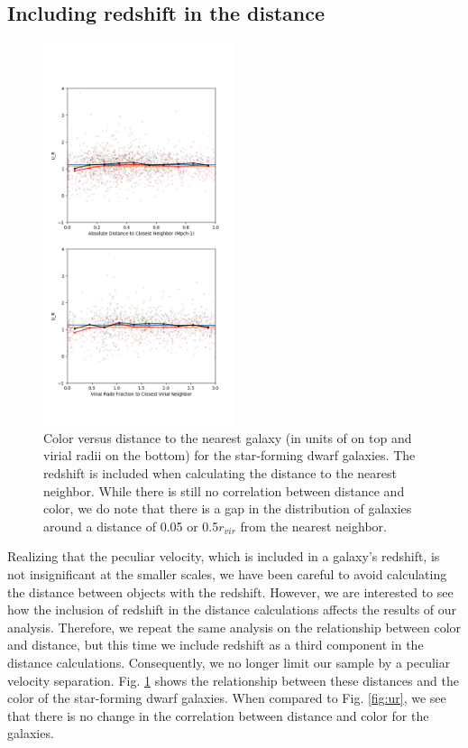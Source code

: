 \subsection{Including redshift in the distance}

\begin{figure}
    \includegraphics[width=0.5\textwidth]{Images/smallScaleEnvironment/dwarf_ur_xyz}
    \caption[Color versus distance calculated with redshift]{Color versus 
    distance to the nearest galaxy (in units of \hMpc on top and virial radii on 
    the bottom) for the star-forming dwarf galaxies.  The redshift is included 
    when calculating the distance to the nearest neighbor.  While there is still 
    no correlation between distance and color, we do note that there is a gap in 
    the distribution of galaxies around a distance of 0.05 \hMpc or 0.5$r_{vir}$ 
    from the nearest neighbor.}
    \label{fig:ur_xyz}
\end{figure}

Realizing that the peculiar velocity, which is included in a galaxy's redshift, 
is not insignificant at the smaller scales, we have been careful to avoid 
calculating the distance between objects with the redshift.  However, we are 
interested to see how the inclusion of redshift in the distance calculations 
affects the results of our analysis.  Therefore, we repeat the same analysis on 
the relationship between color and distance, but this time we include redshift 
as a third component in the distance calculations.  Consequently, we no longer 
limit our sample by a peculiar velocity separation.  Fig. \ref{fig:ur_xyz} shows 
the relationship between these distances and the color of the star-forming dwarf 
galaxies.  When compared to Fig. \ref{fig:ur}, we see that there is no change in 
the correlation between distance and color for the galaxies.  

